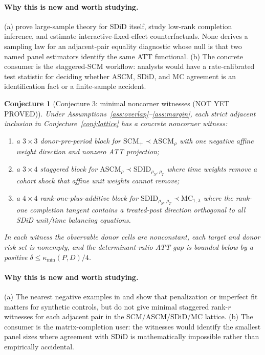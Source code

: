 \documentclass[11pt]{article}
\theoremstyle{definition}
\theoremstyle{plain}
\newtheorem{conjecture}{Conjecture}
\theoremstyle{remark}
\begin{document}
\paragraph{Why this is new and worth studying.}
(a) \citet[Section~2]{ArkhangelskyAtheyHirshbergImbensWager2021} prove
large-sample theory for SDiD itself, \citet[Sections~2--3]{ChoiKwonLiao2024}
study low-rank completion inference, and \citet[Sections~2--3]{Xu2017}
estimate interactive-fixed-effect counterfactuals. None derives a sampling
law for an adjacent-pair equality diagnostic whose null is that two named
panel estimators identify the same ATT functional. (b) The concrete consumer
is the \citet{BenMichaelFellerRothstein2022} staggered-SCM workflow: analysts
would have a rate-calibrated test statistic for deciding whether ASCM, SDiD,
and MC agreement is an identification fact or a finite-sample accident.

\begin{conjecture}[Conjecture 3: minimal noncorner witnesses (NOT YET PROVED)]\label{conj:witnesses}
Under Assumptions~\ref{ass:overlap}--\ref{ass:margin}, each strict adjacent
inclusion in Conjecture~\ref{conj:lattice} has a concrete noncorner witness:
\begin{enumerate}[label=(\roman*)]
\item a $3\times3$ donor-pre-period block for
$\mathrm{SCM}_{+}\prec\mathrm{ASCM}_{\rho}$ with one negative affine weight
direction and nonzero ATT projection;
\item a $3\times4$ staggered block for
$\mathrm{ASCM}_{\rho}\prec\mathrm{SDID}_{\rho_N,\rho_T}$ where time weights
remove a cohort shock that affine unit weights cannot remove;
\item a $4\times4$ rank-one-plus-additive block for
$\mathrm{SDID}_{\rho_N,\rho_T}\prec\mathrm{MC}_{1,\lambda}$ where the
rank-one completion tangent contains a treated-post direction orthogonal to
all SDiD unit/time balancing equations.
\end{enumerate}
In each witness the observable donor cells are nonconstant, each target and
donor risk set is nonempty, and the determinant-ratio ATT gap is bounded below
by a positive $\delta\le\kappa_{\min}(P,D)/4$.
\end{conjecture}
\paragraph{Why this is new and worth studying.}
(a) The nearest negative examples in
\citet[Sections~2--3, bias correction after imperfect pretreatment fit]{BenMichaelFellerRothstein2021}
and
\citet[Sections~2--3, penalized donor-choice objective for disaggregated data]{AbadieLHour2021}
show that penalization or imperfect fit matters for synthetic controls, but
do not give minimal staggered rank-$r$ witnesses for each adjacent pair in
the SCM/ASCM/SDiD/MC lattice. (b) The consumer is the
\citet{AtheyBayatiDoudchenkoImbensKhosravi2021} matrix-completion user: the
witnesses would identify the smallest panel sizes where agreement with SDiD
is mathematically impossible rather than empirically accidental.
\end{document}
